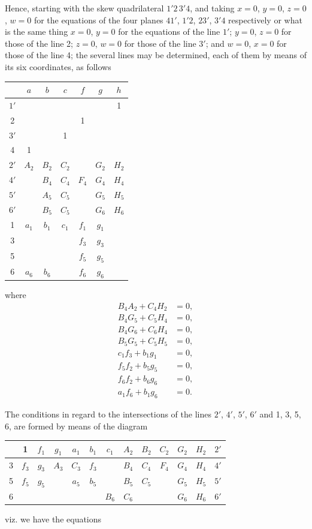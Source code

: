 \documentclass[11pt,a4paper]{article}
\begin{document}
Hence, starting with the skew quadrilateral $1'2\,3'4$, and taking $x=0$, $y=0$, $z=0$, $w=0$ for the equations of the four planes $41'$, $1'2$, $23'$, $3'4$ respectively or what is the same thing $x=0$, $y=0$ for the equations of the line $1'$; $y=0$, $z=0$ for those of the line 2; $z=0$, $w=0$ for those of the line $3'$; and $w=0$, $x=0$ for those of the line 4; the several lines may be determined, each of them by means of its six coordinates, as follows
\begin{center}
\begin{tabular}{c|cccccc}
& $a$ & $b$ & $c$ & $f$ & $g$ & $h$\\\hline
$1'$ & & & & & & 1\\
2 & & & & 1 & &\\
$3'$ & & & 1 & & &\\
4 & 1 & & & & &\\
$2'$ & $A_{2}$ & $B_{2}$ & $C_{2}$ & & $G_{2}$ & $H_{2}$\\
$4'$ & & $B_{4}$ & $C_{4}$ & $F_{4}$ & $G_{4}$ & $H_{4}$\\
$5'$ & & $A_{5}$ & $C_{5}$ & & $G_{5}$ & $H_{5}$\\
$6'$ & & $B_{5}$ & $C_{5}$ & & $G_{6}$ & $H_{6}$\\
1 & $a_{1}$ & $b_{1}$ & $c_{1}$ & $f_{1}$ & $g_{1}$ &\\
3 & & & & $f_{3}$ & $g_{3}$ &\\
5 & & & & $f_{5}$ & $g_{5}$ &\\
6 & $a_{6}$ & $b_{6}$ & & $f_{6}$ & $g_{6}$ &
\end{tabular}
\end{center}
where
\begin{align*}
B_{4}A_{2} + C_{4}H_{2} &= 0,\\
B_{4}G_{5} + C_{5}H_{4} &= 0,\\
B_{4}G_{6} + C_{6}H_{4} &= 0,\\
B_{5}G_{5} + C_{5}H_{5} &= 0,\\
c_{1}f_{3} + b_{1}g_{1} &= 0,\\
f_{5}f_{2} + b_{5}g_{5} &= 0,\\
f_{6}f_{2} + b_{6}g_{6} &= 0,\\
a_{1}f_{6} + b_{1}g_{6} &= 0.
\end{align*}

\newpage
\setcounter{page}{318}

The conditions in regard to the intersections of the lines $2'$, $4'$, $5'$, $6'$ and 1, 3, 5, 6, are formed by means of the diagram
\begin{center}
\begin{tabular}{c|cccccccccccc}
& 1 & $f_{1}$ & $g_{1}$ & $a_{1}$ & $b_{1}$ & $c_{1}$ & $A_{2}$ & $B_{2}$ & $C_{2}$ & $G_{2}$ & $H_{2}$ & $2'$\\\hline
3 & $f_{3}$ & $g_{3}$ & $A_{3}$ & $C_{3}$ & $f_{3}$ & & $B_{4}$ & $C_{4}$ & $F_{4}$ & $G_{4}$ & $H_{4}$ & $4'$\\
5 & $f_{5}$ & $g_{5}$ & & $a_{5}$ & $b_{5}$ & & $B_{5}$ & $C_{5}$ & & $G_{5}$ & $H_{5}$ & $5'$\\
6 & & & & & & $B_{6}$ & $C_{6}$ & & & $G_{6}$ & $H_{6}$ & $6'$
\end{tabular}
\end{center}
viz. we have the equations
\end{document}
